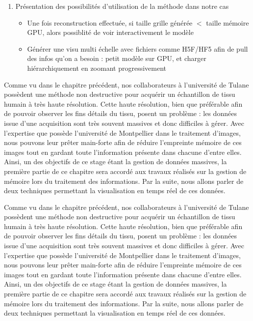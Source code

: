 {{\begin{enumerate}
\begin{itemize}
\begin{itemize}
				\end{itemize}
			\end{itemize}
			\item Présentation des possibilités d'utilisation de la méthode dans notre cas~\begin{itemize}
				\item Une fois reconstruction effectuée, si taille grille générée $<$ taille mémoire GPU, alors possiblité de voir interactivement le modèle
				\item Générer une visu multi échelle avec fichiers comme H5F/HF5 afin de pull des infos qu'on a besoin : petit modèle sur GPU, et charger hiérarchiquement en zoomant progressivement
			\end{itemize}
		\end{enumerate}
	}

	Comme vu dans le chapitre précédent, nos collaborateurs à l'université de Tulane possèdent une méthode non destructive pour acquérir un échantillon de tissu humain à très haute résolution. Cette haute résolution, bien que préférable afin de pouvoir observer les fins détails du tissu, posent un problème : les données issue d'une acquisition sont très souvent massives et donc difficiles à gérer. Avec l'expertise que possède l'université de Montpellier dans le traitement d'images, nous pouvons leur prêter main-forte afin de réduire l'empreinte mémoire de ces images tout en gardant toute l'information présente dans chacune d'entre elles. Ainsi, un des objectifs de ce stage étant la gestion de données massives, la première partie de ce chapitre sera accordé aux travaux réalisés sur la gestion de mémoire lors du traitement des informations. Par la suite, nous allons parler de deux techniques permettant la visualisation en temps réel de ces données.

	Comme vu dans le chapitre précédent, nos collaborateurs à l'université de Tulane possèdent une méthode non destructive pour acquérir un échantillon de tissu humain à très haute résolution. Cette haute résolution, bien que préférable afin de pouvoir observer les fins détails du tissu, posent un problème : les données issue d'une acquisition sont très souvent massives et donc difficiles à gérer. Avec l'expertise que possède l'université de Montpellier dans le traitement d'images, nous pouvons leur prêter main-forte afin de réduire l'empreinte mémoire de ces images tout en gardant toute l'information présente dans chacune d'entre elles. Ainsi, un des objectifs de ce stage étant la gestion de données massives, la première partie de ce chapitre sera accordé aux travaux réalisés sur la gestion de mémoire lors du traitement des informations. Par la suite, nous allons parler de deux techniques permettant la visualisation en temps réel de ces données.

}
